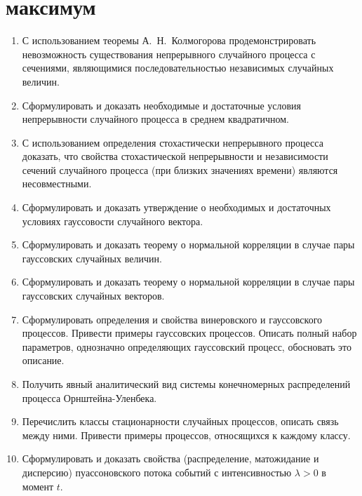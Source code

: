 \documentclass[a4paper,12pt]{extreport}
\renewcommand{\=}[1]{\stackrel{#1}{=}} %
\begin{document}
\section*{ максимум}

\begin{enumerate}
	\item С использованием теоремы А.~Н.~Колмогорова 
	продемонстрировать невозможность существования непрерывного случайного процесса
	с сечениями, являющимися последовательностью независимых случайных величин.

	\item Сформулировать и доказать необходимые и достаточные условия непрерывности
	случайного процесса в среднем квадратичном.

	\item С использованием определения стохастически непрерывного процесса
	доказать, что свойства стохастической непрерывности и независимости 
	сечений случайного процесса (при близких значениях времени) являются несовместными.

	\item Сформулировать и доказать утверждение о необходимых
	и достаточных условиях гауссовости случайного вектора.

	\item Сформулировать и доказать теорему о нормальной корреляции
	в случае пары гауссовских случайных величин.

	\item Сформулировать и доказать теорему о нормальной корреляции
	в случае пары гауссовских случайных векторов.

	\item Сформулировать определения и свойства винеровского
	и гауссовского процессов. Привести примеры гауссовских процессов.
	Описать полный набор параметров, однозначно определяющих гауссовский 
	процесс, обосновать это описание.

	\item Получить явный аналитический вид системы конечномерных
	распределений процесса Орнштейна-Уленбека.

	\item Перечислить классы стационарности случайных процессов,
	описать связь между ними.
	Привести примеры процессов, относящихся к каждому классу.

	\item Сформулировать и доказать свойства
	(распределение, матожидание и дисперсию) пуассоновского
	потока событий с интенсивностью $\lambda > 0$ в момент $t$.


\end{enumerate}
\end{document}
